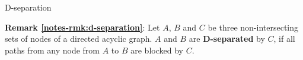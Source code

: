 \documentclass{beamer}
\newcommand{\remark}[2]{\noindent\colorbox{red!10}{\parbox{0.995\textwidth}{\textbf{Remark \ref{notes-rmk:#1}}: #2}}\\}
\begin{document}
\begin{frame}{D-separation}
\remark{d-separation}{Let $A$, $B$ and $C$ be three non-intersecting sets of nodes of a directed acyclic graph. $A$ and $B$ are \textbf{D-separated} by $C$, if all paths from any node from $A$ to $B$ are blocked by $C$.}\vspace{3mm}\pause

   \begin{columns}
   \begin{column}{0.25\textwidth}

\end{column}
\end{columns}
\end{frame}
\end{document}

